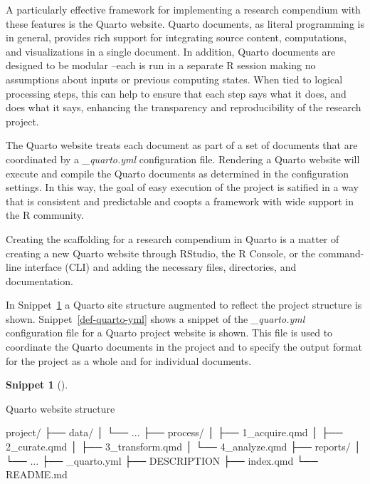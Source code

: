 \documentclass[
  letterpaper,
  krantz1]{latex/krantz-mod}
\newenvironment{Shaded}{\begin{snugshade}}{\end{snugshade}}
\newcommand{\ExtensionTok}[1]{\textcolor[rgb]{0.00,0.00,0.00}{#1}}
\newcommand{\NormalTok}[1]{\textcolor[rgb]{0.00,0.00,0.00}{#1}}
\theoremstyle{definition}
\theoremstyle{definition}
\newtheorem{definition}{Snippet}[chapter]
\theoremstyle{remark}
\begin{document}
A particularly effective framework for implementing a research
compendium with these features is the Quarto website. Quarto documents,
as literal programming is in general, provides rich support for
integrating source content, computations, and visualizations in a single
document. In addition, Quarto documents are designed to be modular
--each is run in a separate R session making no assumptions about inputs
or previous computing states. When tied to logical processing steps,
this can help to ensure that each step says what it does, and does what
it says, enhancing the transparency and reproducibility of the research
project.

The Quarto website treats each document as part of a set of documents
that are coordinated by a \emph{\_quarto.yml} configuration file.
Rendering a Quarto website will execute and compile the Quarto documents
as determined in the configuration settings. In this way, the goal of
easy execution of the project is satified in a way that is consistent
and predictable and coopts a framework with wide support in the R
community.

Creating the scaffolding for a research compendium in Quarto is a matter
of creating a new Quarto website through RStudio, the R Console, or the
command-line interface (CLI) and adding the necessary files,
directories, and documentation.

In Snippet~\ref{def-quarto-site} a Quarto site structure augmented to
reflect the project structure is shown. Snippet~\ref{def-quarto-yml}
shows a snippet of the \emph{\_quarto.yml} configuration file for a
Quarto project website is shown. This file is used to coordinate the
Quarto documents in the project and to specify the output format for the
project as a whole and for individual documents.

\begin{definition}[]\protect\hypertarget{def-quarto-site}{}\label{def-quarto-site}

Quarto website structure

\begin{Shaded}
\begin{Highlighting}[]
\ExtensionTok{project/}
  \ExtensionTok{├──}\NormalTok{ data/}
  \ExtensionTok{│}\NormalTok{   └── ...}
  \ExtensionTok{├──}\NormalTok{ process/}
  \ExtensionTok{│}\NormalTok{   ├── 1\_acquire.qmd}
  \ExtensionTok{│}\NormalTok{   ├── 2\_curate.qmd}
  \ExtensionTok{│}\NormalTok{   ├── 3\_transform.qmd}
  \ExtensionTok{│}\NormalTok{   └── 4\_analyze.qmd}
  \ExtensionTok{├──}\NormalTok{ reports/}
  \ExtensionTok{│}\NormalTok{   └── ...}
  \ExtensionTok{├──}\NormalTok{ \_quarto.yml}
  \ExtensionTok{├──}\NormalTok{ DESCRIPTION}
  \ExtensionTok{├──}\NormalTok{ index.qmd}
  \ExtensionTok{└──}\NormalTok{ README.md}
\end{Highlighting}
\end{Shaded}

\end{definition}
\end{document}

